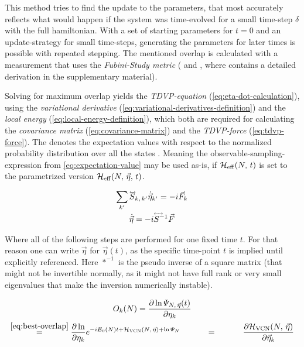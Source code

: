 This method tries to find the update to the parameters, that most accurately reflects what would happen if the system was time-evolved for a small time-step $\delta$ with the full hamiltonian.
With a set of starting parameters for $t=0$ and an update-strategy for small time-steps, generating the parameters for later times is possible with repeated stepping.
The mentioned overlap is calculated with a measurement that uses the \emph{Fubini-Study metric} (\cite{variationalClassicalNetworksPaper} and \cite{probabilitySamplingRequirementVCN}, where \cite{probabilitySamplingRequirementVCN} contains a detailed derivation in the supplementary material).

Solving for maximum overlap yields the \emph{TDVP-equation} (\autoref{eq:eta-dot-calculation}), using the \emph{variational derivative} (\autoref{eq:variational-derivatives-definition}) and the \emph{local energy} (\autoref{eq:local-energy-definition}), which both are required for calculating the \emph{covariance matrix} (\autoref{eq:covariance-matrix}) and the \emph{TDVP-force} (\autoref{eq:tdvp-force}).
The \etaExpectationVal{\ast} denotes the expectation values with respect to the normalized probability distribution over all the states  \cite{probabilitySamplingRequirementVCN}.
Meaning the observable-sampling-expression from \autoref{eq:expectation-value} may be used as-is, if $\HeffOft$ is set to the parametrized version $\HeffOft[N,\,\vec{\eta}]$.

\begin{equation}
    \label{eq:eta-dot-calculation}
    \begin{gathered}
        \lsum[k'] \matvec{S}_{k,\, k'} \dot{\vec{\eta}}_{k'} = -i \vec{F}_k\\
        \dot{\vec{\eta}} = -i {\matvec{S^{-1}}} \vec{F}
    \end{gathered}
\end{equation}

Where all of the following steps are performed for one fixed time $t$.
For that reason one can write $\vec{\eta}$ for $\vec{\eta}(t)$, as the specific time-point $t$ is implied until explicitly referenced.
Here $\ast^{-1}$ is the pseudo inverse of a square matrix (that might not be invertible normally, as it might not have full rank or very small eigenvalues that make the inversion numerically instable).

\begin{equation}
    \label{eq:variational-derivatives-definition}
    \begin{gathered}
        O_{k}(N) = \frac{\partial \ln \psiEta{N,\,\vec{\eta}}{t}}{\partial \eta_k}\\
        \stackrel{\ref{eq:best-overlap}}{=} \frac{\partial \ln }{\partial \eta_k} e^{-i E_0(N) t + \Hvcn{\vec{\eta}} + \ln \psiN} 
        \stackrel{\phantom{\ref{eq:best-overlap}}}{=} 
        \frac{\partial \Hvcn{\vec{\eta}} }{\partial \vec{\eta}_k} 
    \end{gathered}
\end{equation}

